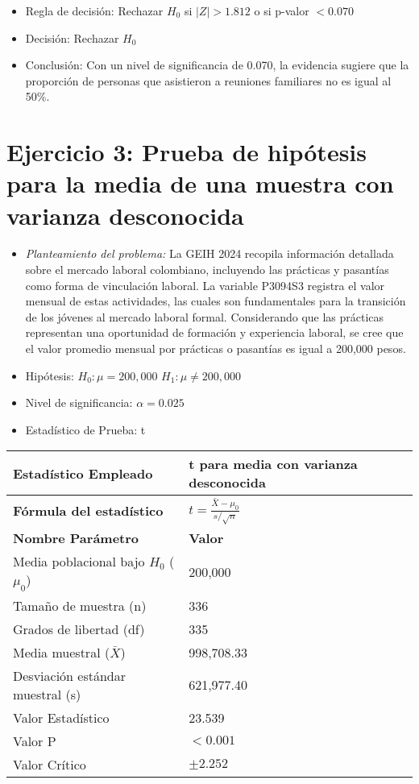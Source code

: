 \documentclass[12pt,a4paper]{article}
\begin{document}
\begin{itemize}
    \item Regla de decisión: Rechazar $H_0$ si $|Z| > 1.812$ o si p-valor $< 0.070$
    \item Decisión: Rechazar $H_0$
    \item Conclusión: Con un nivel de significancia de 0.070, la evidencia sugiere que la proporción de personas que asistieron a reuniones familiares no es igual al 50\%.
\end{itemize}

\section*{Ejercicio 3: Prueba de hipótesis para la media de una muestra con varianza desconocida}
\begin{itemize}
    \item \textit{Planteamiento del problema:} La GEIH 2024 recopila información detallada sobre el mercado laboral colombiano, incluyendo las prácticas y pasantías como forma de vinculación laboral. La variable P3094S3 registra el valor mensual de estas actividades, las cuales son fundamentales para la transición de los jóvenes al mercado laboral formal. Considerando que las prácticas representan una oportunidad de formación y experiencia laboral, se cree que el valor promedio mensual por prácticas o pasantías es igual a 200,000 pesos.
    \item Hipótesis: \quad $H_{0}: \mu = 200,000$ \hspace{2cm} $H_{1}: \mu \neq 200,000$
    \item Nivel de significancia: $\alpha = 0.025$
    \item Estadístico de Prueba: t
\end{itemize}

\begin{tabular}{|m{7cm}|m{7cm}|}
\hline
\textbf{Estadístico Empleado} & t para media con varianza desconocida \\ \hline
\textbf{Fórmula del estadístico} & $t = \frac{\bar{X} - \mu_0}{s/\sqrt{n}}$ \\ \hline
\textbf{Nombre Parámetro} & \textbf{Valor} \\ \hline
Media poblacional bajo $H_0$ ($\mu_0$) & 200,000 \\ \hline
Tamaño de muestra (n) & 336 \\ \hline
Grados de libertad (df) & 335 \\ \hline
Media muestral ($\bar{X}$) & 998,708.33 \\ \hline
Desviación estándar muestral (s) & 621,977.40 \\ \hline
Valor Estadístico & 23.539 \\ \hline
Valor P & $< 0.001$ \\ \hline
Valor Crítico & $\pm 2.252$ \\ \hline
\end{tabular}
\end{document}
